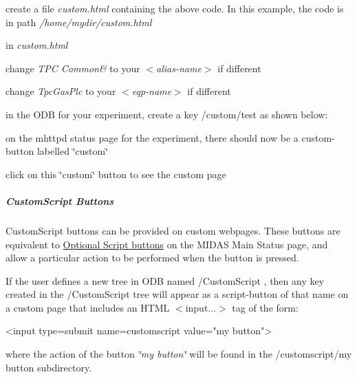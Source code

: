 \begin{DoxyItemize}
\item create a file {\itshape custom.html\/} containing the above code. In this example, the code is in path {\itshape /home/mydir/custom.html\/}
\item in {\itshape custom.html\/}
\begin{DoxyItemize}
\item change {\itshape TPC Common\&\/} to your {\itshape  $<$alias-\/name$>$ \/} if different
\item change {\itshape TpcGasPlc\/} to your {\itshape $<$eqp-\/name$>$ \/} if different
\end{DoxyItemize}
\item in the ODB for your experiment, create a key /custom/test as shown below: 

\item on the mhttpd status page for the experiment, there should now be a custom-\/button labelled \char`\"{}custom\char`\"{}
\item click on this \char`\"{}custom\char`\"{} button to see the custom page
\end{DoxyItemize}

\par


\par
 \label{RC_mhttpd_custom_features_idx_mhttpd_buttons_customscript}
\hypertarget{RC_mhttpd_custom_features_idx_mhttpd_buttons_customscript}{}
 \label{RC_mhttpd_custom_features_idx_mhttpd_custom_script-button}
\hypertarget{RC_mhttpd_custom_features_idx_mhttpd_custom_script-button}{}
 \hypertarget{RC_mhttpd_custom_features_RC_mhttpd_custom_script_buttons}{}\subparagraph{CustomScript Buttons}\label{RC_mhttpd_custom_features_RC_mhttpd_custom_script_buttons}
CustomScript buttons can be provided on custom webpages. These buttons are equivalent to \hyperlink{RC_mhttpd_status_page_features_RC_mhttpd_status_script_buttons}{Optional Script buttons} on the MIDAS Main Status page, and allow a particular action to be performed when the button is pressed.

If the user defines a new tree in ODB named /CustomScript , then any key created in the /CustomScript tree will appear as a script-\/button of that name on a custom page that includes an HTML $<$input...$>$ tag of the form: 
\begin{DoxyCode}
        <input type=submit name=customscript value="my button">
\end{DoxyCode}
 where the action of the button {\itshape  \char`\"{}my button\char`\"{}\/} will be found in the /customscript/my button subdirectory.

